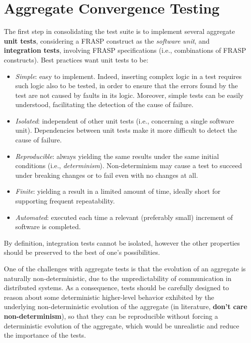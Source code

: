 
\section{Aggregate Convergence Testing}
\label{section:analysis:aggregate-convergence-testing}

The first step in consolidating the test suite is to implement several
aggregate \textbf{unit tests}, considering a FRASP construct as the
\textit{software unit}, and \textbf{integration tests}, involving FRASP
specifications (i.e., combinations of FRASP constructs). Best practices
\cite{UnitTesting} want unit tests to be:
\begin{itemize}
  \item \textit{Simple}: easy to implement. Indeed, inserting complex logic in
        a test requires such logic also to be tested, in order to ensure that
        the errors found by the test are not caused by faults in its logic.
        Moreover, simple tests can be easily understood, facilitating the
        detection of the cause of failure.
  \item \textit{Isolated}: independent of other unit tests (i.e., concerning
        a single software unit). Dependencies between unit tests make it more
        difficult to detect the cause of failure.
  \item \textit{Reproducible}: always yielding the same results under the same
        initial conditions (i.e., \textit{determinism}). Non-determinism may
        cause a test to succeed under breaking changes or to fail even with
        no changes at all.
  \item \textit{Finite}: yielding a result in a limited amount of time, ideally
        short for supporting frequent repeatability.
  \item \textit{Automated}: executed each time a relevant (preferably small)
        increment of software is completed.
\end{itemize}

By definition, integration tests cannot be isolated, however the other
properties should be preserved to the best of one's possibilities.

One of the challenges with aggregate tests is that the evolution of an
aggregate is naturally non-deterministic, due to the unpredictability of
communication in distributed systems. As a consequence, tests should be
carefully designed to reason about some deterministic higher-level behavior
exhibited by the underlying non-deterministic evolution of the aggregate (in
literature, \textbf{don't care non-determinism}), so that they can be
reproducible without forcing a deterministic evolution of the aggregate, which
would be unrealistic and reduce the importance of the tests.

